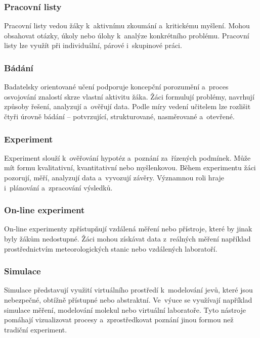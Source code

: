 \documentclass[male,czech,api_bc]{kitheses}
\begin{document}
\subsubsection{Pracovní listy}

Pracovní listy vedou žáky k~aktivnímu zkoumání a~kritickému myšlení. Mohou obsahovat otázky, úkoly nebo úlohy k~analýze konkrétního problému. Pracovní listy lze využít při individuální, párové i~skupinové práci.

\subsubsection{Bádání}

Badatelsky orientované učení podporuje koncepční porozumění a~proces osvojování znalostí skrze vlastní aktivitu žáka. Žáci formulují problémy, navrhují způsoby řešení, analyzují a~ověřují data. Podle míry vedení učitelem lze rozlišit čtyři úrovně bádání – potvrzující, strukturované, nasměrované a~otevřené.

\subsubsection{Experiment}

Experiment slouží k~ověřování hypotéz a~poznání za~řízených podmínek. Může mít formu kvalitativní, kvantitativní nebo myšlenkovou. Během experimentu žáci pozorují, měří, analyzují data a~vyvozují závěry. Významnou roli hraje i~plánování a~zpracování výsledků.

\subsubsection{On-line experiment}

On-line experimenty zpřístupňují vzdálená měření nebo přístroje, které by jinak byly žákům nedostupné. Žáci mohou získávat data z~reálných měření například prostřednictvím meteorologických stanic nebo vzdálených laboratoří.

\subsubsection{Simulace}

Simulace představují využití virtuálního prostředí k~modelování jevů, které jsou nebezpečné, obtížně přístupné nebo abstraktní. Ve~výuce se využívají například simulace měření, modelování molekul nebo virtuální laboratoře. Tyto nástroje pomáhají vizualizovat procesy a~zprostředkovat poznání jinou formou než tradiční experiment.
\end{document}
